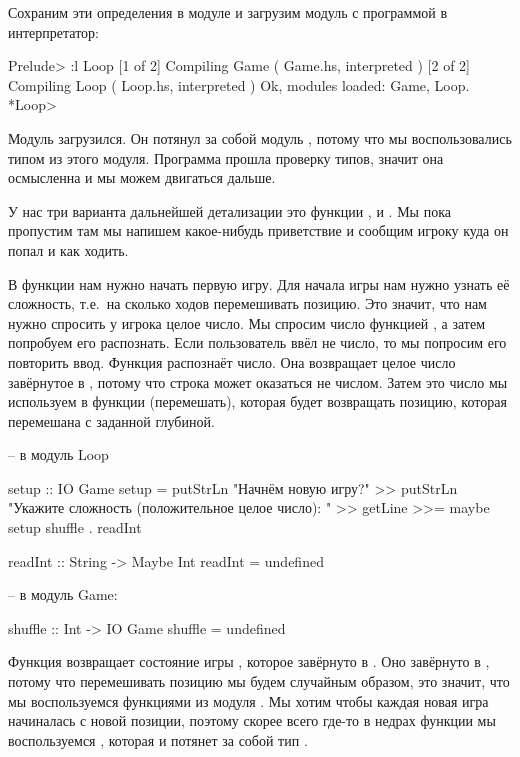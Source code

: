 Сохраним эти определения в модуле  и загрузим модуль 
с программой в интерпретатор:

\begin{code}
Prelude> :l Loop
[1 of 2] Compiling Game             ( Game.hs, interpreted )
[2 of 2] Compiling Loop             ( Loop.hs, interpreted )
Ok, modules loaded: Game, Loop.
*Loop> 
\end{code}

Модуль загрузился. Он потянул за собой модуль ,
потому что мы воспользовались типом  из этого модуля.
Программа прошла проверку типов, значит она осмысленна и
мы можем двигаться дальше. 

У нас три варианта дальнейшей детализации это функции 
,  и . Мы пока
пропустим  там мы напишем какое-нибудь 
приветствие и сообщим игроку куда он попал и как ходить. 

В функции  нам нужно начать первую игру.
Для начала игры нам нужно узнать её сложность, т.е.~на
сколько ходов перемешивать позицию. Это значит, что
нам нужно спросить у игрока целое число. Мы спросим
число функцией , а затем попробуем его распознать.
Если пользователь ввёл не число, то мы попросим его повторить ввод.
Функция \mbox{} распознаёт число. 
Она возвращает целое число завёрнутое в , потому что 
строка может оказаться не числом. Затем это число мы используем 
в функции  (перемешать), которая будет возвращать
позицию, которая перемешана с заданной глубиной.

\begin{code}
-- в модуль Loop

setup :: IO Game
setup = putStrLn "Начнём новую игру?" >>
    putStrLn "Укажите сложность (положительное целое число): " >>
    getLine >>= maybe setup shuffle . readInt 

readInt :: String -> Maybe Int
readInt = undefined

-- в модуль Game:

shuffle :: Int -> IO Game
shuffle = undefined
\end{code}

Функция  возвращает состояние игры ,
которое завёрнуто в . Оно завёрнуто в , потому
что перемешивать позицию мы будем случайным образом, это
значит, что мы воспользуемся функциями из модуля .
Мы хотим чтобы каждая новая игра начиналась с новой позиции,
поэтому скорее всего где-то в недрах функции 
мы воспользуемся , которая и потянет за собой
тип . 

